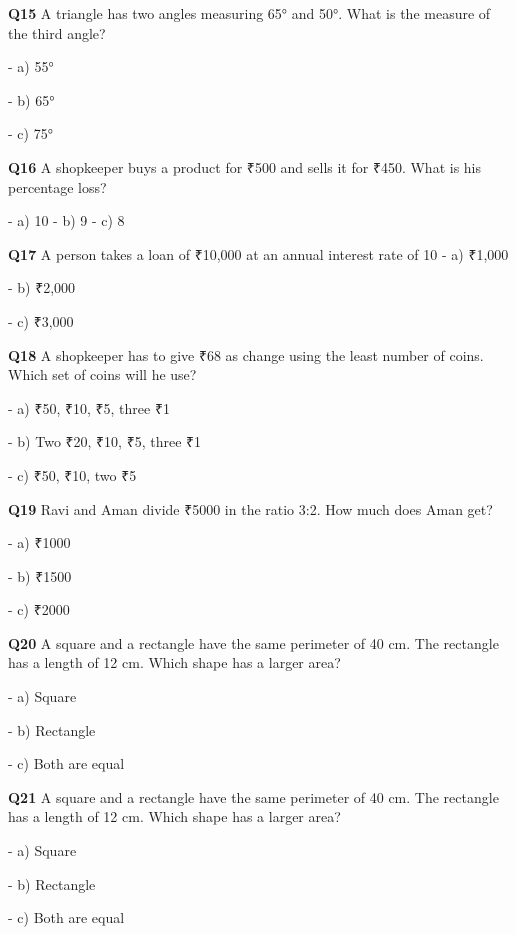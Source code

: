 \textbf{Q15} A triangle has two angles measuring 65° and 50°. What is the measure of the third angle?\par
\quad - a) 55°\par
\quad - b) 65°\par
\quad - c) 75°\par

\textbf{Q16} A shopkeeper buys a product for ₹500 and sells it for ₹450. What is his percentage loss?\par
\quad - a) 10 %
\quad - b) 9 %
\quad - c) 8 %

\textbf{Q17} A person takes a loan of ₹10,000 at an annual interest rate of 10 %
\quad - a) ₹1,000\par
\quad - b) ₹2,000\par
\quad - c) ₹3,000\par

\textbf{Q18} A shopkeeper has to give ₹68 as change using the least number of coins. Which set of coins will he use?\par
\quad - a) ₹50, ₹10, ₹5, three ₹1\par
\quad - b) Two ₹20, ₹10, ₹5, three ₹1\par
\quad - c) ₹50, ₹10, two ₹5\par

\textbf{Q19} Ravi and Aman divide ₹5000 in the ratio 3:2. How much does Aman get?\par
\quad - a) ₹1000\par
\quad - b) ₹1500\par
\quad - c) ₹2000\par

\textbf{Q20} A square and a rectangle have the same perimeter of 40 cm. The rectangle has a length of 12 cm. Which shape has a larger area?\par
\quad - a) Square\par
\quad - b) Rectangle\par
\quad - c) Both are equal\par

\textbf{Q21} A square and a rectangle have the same perimeter of 40 cm. The rectangle has a length of 12 cm. Which shape has a larger area?\par
\quad - a) Square\par
\quad - b) Rectangle\par
\quad - c) Both are equal\par

